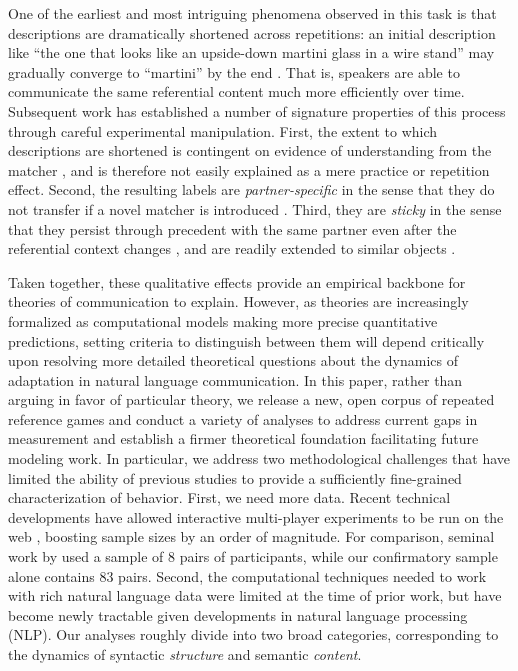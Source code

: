 \documentclass[alpha-refs]{wiley-article}
\begin{document}
One of the earliest and most intriguing phenomena observed in this task is that descriptions are dramatically shortened across repetitions: an initial description like ``the one that looks like an upside-down martini glass in a wire stand'' may gradually converge to ``martini'' by the end  \citep{KraussWeinheimer64_ReferencePhrases}. 
That is, speakers are able to communicate the same referential content much more efficiently over time.
Subsequent work has established a number of signature properties of this process through careful experimental manipulation.
First, the extent to which descriptions are shortened is contingent on evidence of understanding from the matcher \citep{KraussWeinheimer66_Tangrams,KraussEtAl77_AudioVisualBackChannel,HupetChantraine92_CollaborationOrRepitition}, and is therefore not easily explained as a mere practice or repetition effect.
Second, the resulting labels are \emph{partner-specific} in the sense that they do not transfer if a novel matcher is introduced \citep{WilkesGibbsClark92_CoordinatingBeliefs,MetzingBrennan03_PartnerSpecificPacts,brennan_partner-specific_2009}.
Third, they are \emph{sticky} in the sense that they persist through precedent with the same partner even after the referential context changes \citep{BrennanClark96_ConceptualPactsConversation}, and are readily extended to similar objects \citep{MarkmanMakin98_ReferentialCommunicationCategory}.

Taken together, these qualitative effects provide an empirical backbone for theories of communication to explain. %
However, as theories are increasingly formalized as computational models making more precise quantitative predictions, setting criteria to distinguish between them will depend critically upon resolving more detailed theoretical questions about the dynamics of adaptation in natural language communication.
In this paper, rather than arguing in favor of particular theory, we release a new, open corpus of repeated reference games and conduct a variety of analyses to address current gaps in measurement and establish a firmer theoretical foundation facilitating future modeling work.
In particular, we address two methodological challenges that have limited the ability of previous studies to provide a sufficiently fine-grained characterization of behavior.
First, we need more data.
Recent technical developments have allowed interactive multi-player experiments to be run on the web \citep{Hawkins15_RealTimeWebExperiments}, boosting sample sizes by an order of magnitude. 
For comparison, seminal work by \cite{ClarkWilkesGibbs86_ReferringCollaborative} used a sample of 8 pairs of participants, while our confirmatory sample alone contains 83 pairs.
Second, the computational techniques needed to work with rich natural language data were limited at the time of prior work, but have become newly tractable given developments in natural language processing (NLP).
Our analyses roughly divide into two broad categories, corresponding to the dynamics of syntactic \emph{structure} and semantic \emph{content}.
\end{document}
